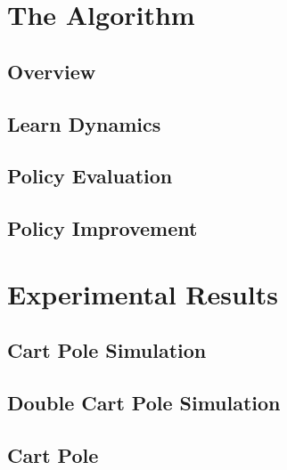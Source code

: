 \section{The Algorithm}
\subsection{Overview}
\subsection{Learn Dynamics}
\subsection{Policy Evaluation}
\subsection{Policy Improvement}

\section{Experimental Results}

\subsection{Cart Pole Simulation}
\subsection{Double Cart Pole Simulation}
\subsection{Cart Pole}